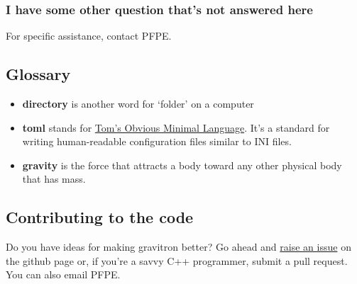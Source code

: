 \documentclass{pfpe-manual}
\begin{document}
%
%
%
%

\subsubsection{I have some other question that's not answered here}
For specific assistance, contact PFPE.

\subsection{Glossary}
\begin{itemize}
\item \textbf{directory} is another word for `folder' on a computer
\item \textbf{toml} stands for \href{https://toml.io/}{Tom's Obvious Minimal Language}. It's a standard for writing human-readable configuration files similar to INI files.
\item \textbf{gravity} is the force that attracts a body toward any other physical body that has mass.
\end{itemize}

\subsection{Contributing to the code}
Do you have ideas for making gravitron better? Go ahead and \href{https://github.com/hfmark/gravitron/issues}{raise an issue} on the github page or, if you're a savvy C++ programmer, submit a pull request. You can also email PFPE.
\end{document}
